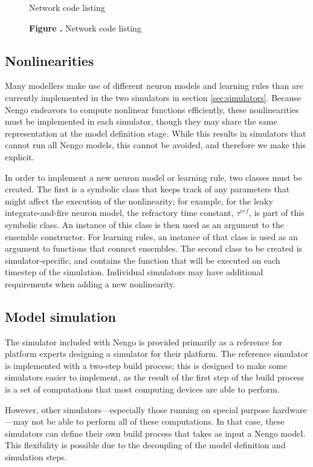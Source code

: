 \documentclass{frontiersSCNS}
\begin{document}
\begin{figure}
\begin{center}
  Network code listing
\end{center}
 \textbf{\label{fig:01} Figure .}{
   Network code listing}
\end{figure}

\subsection{Nonlinearities}

Many modellers make use of
different neuron models and
learning rules than are
currently implemented
in the two simulators
in section \ref{sec:simulators}.
Because Nengo endeavors
to compute nonlinear functions efficiently,
these nonlinearities
must be implemented in each simulator,
though they may share the same representation
at the model definition stage.
While this results in simulators
that cannot run all Nengo models,
this cannot be avoided,
and therefore we make this explicit.

In order to implement
a new neuron model or learning rule,
two classes must be created.
The first is a symbolic class
that keeps track of any parameters
that might affect the execution
of the nonlinearity;
for example, for
the leaky integrate-and-fire neuron model,
the refractory time constant,
$\tau^{ref}$, is part of this symbolic class.
An instance of this class
is then used as an argument
to the ensemble constructor.
For learning rules,
an instance of that class
is used as an argument
to functions that connect ensembles.
The second class to be created
is simulator-specific,
and contains the function that will be
executed on each timestep of the simulation.
Individual simulators may have additional
requirements when adding
a new nonlinearity.

\subsection{Model simulation}

The simulator included with Nengo
is provided primarily as a reference
for platform experts designing a simulator
for their platform.
The reference simulator is implemented with
a two-step build process;
this is designed to make
some simulators easier to implement,
as the result of
the first step of the build process
is a set of computations
that most computing devices are able to perform.

However, other simulators---especially
those running on special purpose
hardware---may not be able
to perform all of these computations.
In that case, these simulators
can define their own build process
that takes as input a Nengo model.
This flexibility is possible
due to the decoupling of
the model definition and simulation steps.
\end{document}
